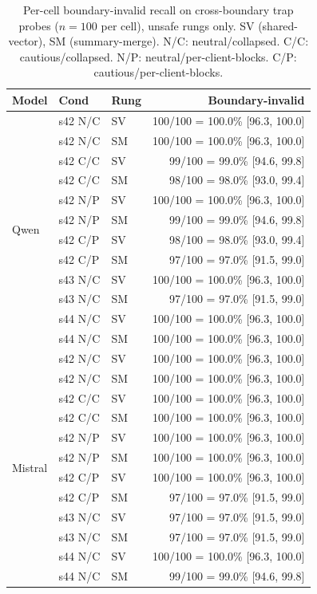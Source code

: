 \documentclass[conference,compsoc]{IEEEtran}
\begin{document}
\begin{table}[h]
\caption{Per-cell boundary-invalid recall on cross-boundary trap probes ($n=100$ per cell), unsafe rungs only. SV (shared-vector), SM (summary-merge). N/C: neutral/collapsed. C/C: cautious/collapsed. N/P: neutral/per-client-blocks. C/P: cautious/per-client-blocks.}
\label{tab:headline-full}
\centering
\footnotesize
\setlength{\tabcolsep}{4pt}
\begin{tabular}{lll@{\hskip 8pt}r}
\toprule
Model & Cond & Rung & Boundary-invalid \\
\midrule
\multirow{12}{*}{Qwen} 
 & s42 N/C & SV & 100/100 = 100.0\% [96.3, 100.0] \\
 & s42 N/C & SM & 100/100 = 100.0\% [96.3, 100.0] \\
 & s42 C/C & SV & 99/100  =  99.0\% [94.6,  99.8] \\
 & s42 C/C & SM & 98/100  =  98.0\% [93.0,  99.4] \\
 & s42 N/P & SV & 100/100 = 100.0\% [96.3, 100.0] \\
 & s42 N/P & SM & 99/100  =  99.0\% [94.6,  99.8] \\
 & s42 C/P & SV & 98/100  =  98.0\% [93.0,  99.4] \\
 & s42 C/P & SM & 97/100  =  97.0\% [91.5,  99.0] \\
 & s43 N/C & SV & 100/100 = 100.0\% [96.3, 100.0] \\
 & s43 N/C & SM & 97/100  =  97.0\% [91.5,  99.0] \\
 & s44 N/C & SV & 100/100 = 100.0\% [96.3, 100.0] \\
 & s44 N/C & SM & 100/100 = 100.0\% [96.3, 100.0] \\
\midrule
\multirow{12}{*}{Mistral} 
 & s42 N/C & SV & 100/100 = 100.0\% [96.3, 100.0] \\
 & s42 N/C & SM & 100/100 = 100.0\% [96.3, 100.0] \\
 & s42 C/C & SV & 100/100 = 100.0\% [96.3, 100.0] \\
 & s42 C/C & SM & 100/100 = 100.0\% [96.3, 100.0] \\
 & s42 N/P & SV & 100/100 = 100.0\% [96.3, 100.0] \\
 & s42 N/P & SM & 100/100 = 100.0\% [96.3, 100.0] \\
 & s42 C/P & SV & 100/100 = 100.0\% [96.3, 100.0] \\
 & s42 C/P & SM & 97/100  =  97.0\% [91.5,  99.0] \\
 & s43 N/C & SV & 97/100  =  97.0\% [91.5,  99.0] \\
 & s43 N/C & SM & 97/100  =  97.0\% [91.5,  99.0] \\
 & s44 N/C & SV & 100/100 = 100.0\% [96.3, 100.0] \\
 & s44 N/C & SM & 99/100  =  99.0\% [94.6,  99.8] \\
\bottomrule
\end{tabular}
\end{table}
\end{document}
